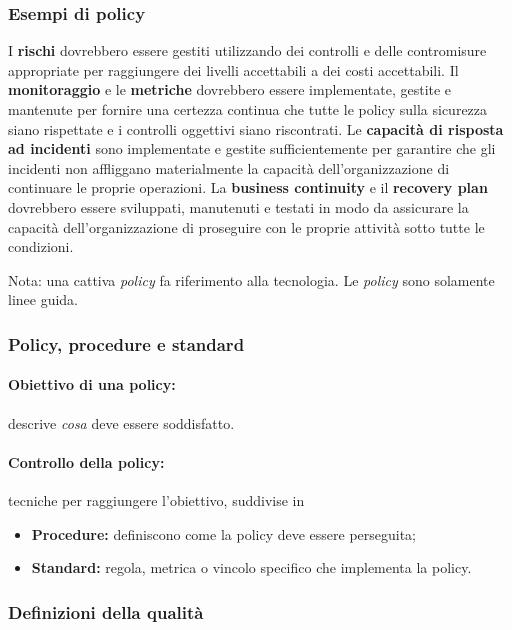 \subsubsection{Esempi di policy}

I \textbf{rischi} dovrebbero essere gestiti utilizzando dei controlli e delle 
contromisure appropriate per raggiungere dei livelli accettabili a dei costi 
accettabili. Il \textbf{monitoraggio} e le \textbf{metriche} dovrebbero essere 
implementate, gestite e mantenute per fornire una certezza continua che tutte 
le policy sulla sicurezza siano rispettate e i controlli oggettivi siano 
riscontrati. Le \textbf{capacità di risposta ad incidenti} sono implementate e 
gestite sufficientemente per garantire che gli incidenti non affliggano 
materialmente la capacità dell'organizzazione di continuare le proprie 
operazioni. 
La \textbf{business continuity} e il \textbf{recovery plan} dovrebbero essere 
sviluppati, manutenuti e testati in modo da assicurare la capacità 
dell'organizzazione di proseguire con le proprie attività sotto tutte le 
condizioni.


Nota: una cattiva \textit{policy} fa riferimento alla tecnologia. Le
\textit{policy} sono solamente linee guida.

\subsubsection{Policy, procedure e standard}

\paragraph*{Obiettivo di una policy:} descrive \textit{cosa} deve essere 
soddisfatto.

\paragraph*{Controllo della policy:} tecniche per raggiungere l'obiettivo, 
suddivise in
\begin{itemize}
  \item \textbf{Procedure:} definiscono come la policy deve essere perseguita;
  \item \textbf{Standard:} regola, metrica o vincolo specifico che implementa 
  la policy.
\end{itemize}

\subsubsection{Definizioni della qualità}

